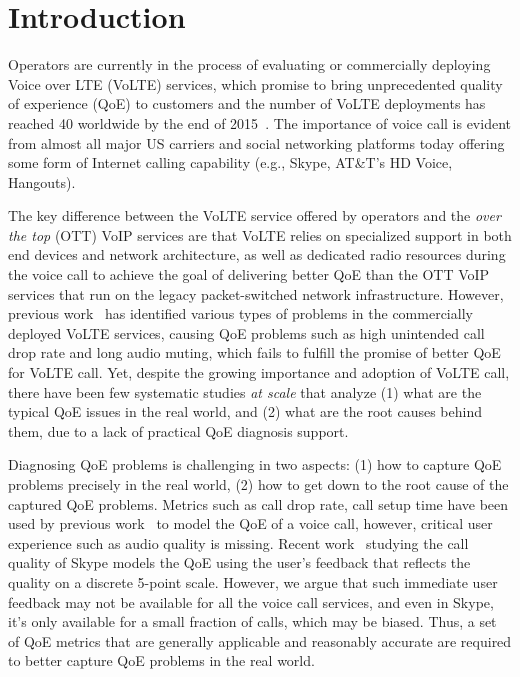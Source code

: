 

\section{Introduction}
\label{sec:intro}
Operators are currently in the process of evaluating or commercially deploying Voice over LTE (VoLTE) services, which promise to bring unprecedented quality of experience (QoE) to customers and the number of VoLTE deployments has reached 40 worldwide by the end of 2015~\cite{volte_number}. The importance of voice call is evident from almost all major US carriers and social networking platforms today offering some form of Internet calling capability (e.g., Skype, AT\&T's HD Voice, Hangouts).

The key difference between the VoLTE service offered by operators and the \textit{over the top} (OTT) VoIP services are that VoLTE relies on specialized support in both end devices and network architecture, as well as dedicated radio resources during the voice call to achieve the goal of delivering better QoE than the OTT VoIP services that run on the legacy packet-switched network infrastructure. However, previous work~\cite{jia2015performance} has identified various types of problems in the commercially deployed VoLTE services, causing QoE problems such as high unintended call drop rate and long audio muting, which 
fails to fulfill the promise of better QoE for VoLTE call. Yet, despite the growing importance and adoption of VoLTE call, there have been few systematic studies \textit{at scale} that analyze (1) what are the typical QoE issues in the real world, and (2) what are the root causes behind them, due to a lack of practical QoE diagnosis support. 

Diagnosing QoE problems is challenging in two aspects: (1) how to capture QoE problems precisely in the real world, (2) how to get down to the root cause of the captured QoE problems. Metrics such as call drop rate, call setup time have been used by previous work~\cite{jia2015performance} to model the QoE of a voice call, however,  critical user experience such as audio quality is missing. Recent work~\cite{jiang2016improving} studying the call quality of Skype models the QoE using the user's feedback that reflects the quality on a discrete 5-point scale. However, we argue that such immediate user feedback may not be available for all the voice call services, and even in Skype, it's only available for a small fraction of calls, which may be biased. Thus, a set of QoE metrics that are generally applicable and reasonably accurate are required to better capture QoE problems in the real world.

